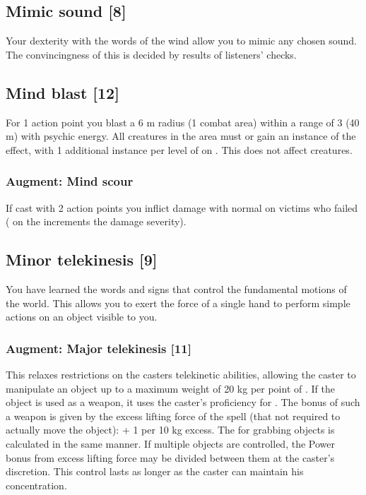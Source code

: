 \subsection{Mimic sound [8]}
Your dexterity with the words of the wind allow you to mimic any chosen sound. The convincingness of this is decided by results of listeners'  checks.

\subsection{Mind blast [12]}
For 1 action point you blast a 6 m radius (1 combat area) within a range of 3 (40 m) with psychic energy. All creatures in the area must  or gain an instance of the  effect, with 1 additional instance per level of  on . This does not affect  creatures.
\subsubsection{Augment: Mind scour}
If cast with 2 action points you inflict damage with normal  on victims who failed  ( on the  increments the damage severity).

\subsection{Minor telekinesis [9]}
\label{spell:min-tele}
You have learned the words and signs that control the fundamental motions of the world. This allows you to exert the force of a single hand to perform simple actions on an object visible to you.
\subsubsection{Augment: Major telekinesis [11]}
This relaxes restrictions on the casters telekinetic abilities, allowing the caster to manipulate an object up to a maximum weight of 20 kg per point of . If the object is used as a weapon, it uses the caster's  proficiency for . The bonus  of such a weapon is given by the excess lifting force of the spell (that not required to actually move the object):  + 1 per 10 kg excess. The  for grabbing objects is calculated in the same manner. If multiple objects are controlled, the Power bonus from excess lifting force may be divided between them at the caster's discretion. This control lasts as longer as the caster can maintain his concentration.


